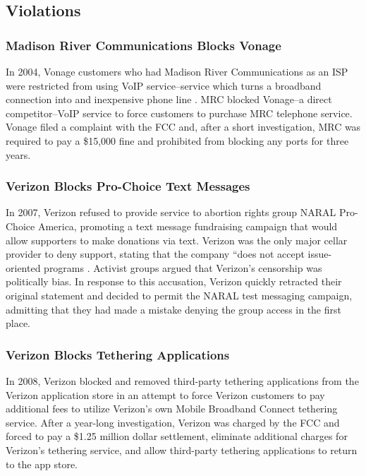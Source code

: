 \documentclass[11pt]{article}
\begin{document}
\subsection{Violations}
\subsubsection{Madison River Communications Blocks Vonage}
In 2004, Vonage customers who had Madison River Communications as an ISP were restricted from using VoIP service--service which turns a broadband connection into and inexpensive phone line \cite{DD}.  MRC blocked Vonage--a direct competitor--VoIP service to force customers to purchase MRC telephone service.  Vonage filed a complaint with the FCC and, after a short investigation, MRC was required to pay a \$15,000 fine and prohibited from blocking any ports for three years.

\subsubsection{Verizon Blocks Pro-Choice Text Messages}
In 2007, Verizon refused to provide service to abortion rights group NARAL Pro-Choice America, promoting a text message fundraising campaign that would allow supporters to make donations via text. \cite{DD}  Verizon was the only major cellar provider to deny support, stating that the company ``does not accept issue-oriented programs \cite{DD}.  Activist groups argued that Verizon's censorship was politically bias.  In response to this accusation, Verizon quickly retracted their original statement and decided to permit the NARAL test messaging campaign, admitting that they had made a mistake denying the group access in the first place.

\subsubsection{Verizon Blocks Tethering Applications}
In 2008, Verizon blocked and removed third-party tethering applications from the Verizon application store in an attempt to force Verizon customers to pay additional fees to utilize Verizon's own Mobile Broadband Connect tethering service.  After a year-long investigation, Verizon was charged by the FCC and forced to pay a \$1.25 million dollar settlement, eliminate additional charges for Verizon's tethering service, and allow third-party tethering applications to return to the app store.
\end{document}
